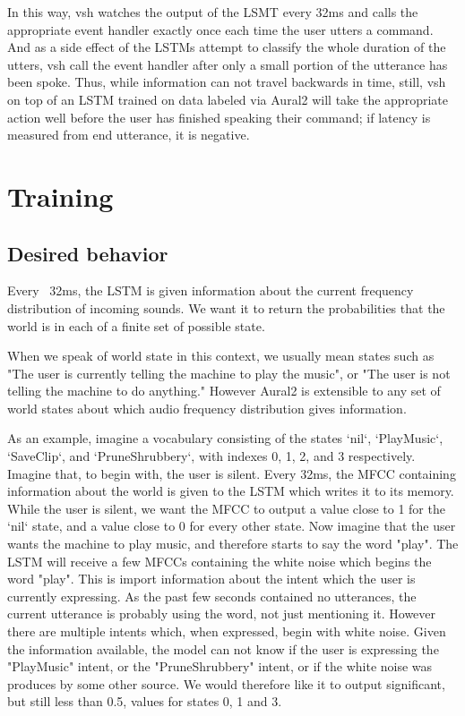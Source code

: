 \documentclass[conference]{IEEEtran}
\begin{document}
In this way, vsh watches the output of the LSMT every 32ms and calls the appropriate event handler exactly once each time the user utters a command.
And as a side effect of the LSTMs attempt to classify the whole duration of the utters, vsh call the event handler after only a small portion of the utterance has been spoke.
Thus, while information can not travel backwards in time, still,
vsh on top of an LSTM trained on data labeled via Aural2 will take the appropriate action well before the user has finished speaking their command;
if latency is measured from end utterance, it is negative.

\section{Training}
\subsection{Desired behavior}
Every ~32ms, the LSTM is given information about the current frequency distribution of incoming sounds.
We want it to return the probabilities that the world is in each of a finite set of possible state.

When we speak of world state in this context, we usually mean states such as "The user is currently telling the machine to play the music", or "The user is not telling the machine to do anything."
However Aural2 is extensible to any set of world states about which audio frequency distribution gives information.

As an example, imagine a vocabulary consisting of the states `nil`, `PlayMusic`, `SaveClip`, and `PruneShrubbery`, with indexes 0, 1, 2, and 3 respectively.
Imagine that, to begin with, the user is silent.
Every 32ms, the MFCC containing information about the world is given to the LSTM which writes it to its memory.
While the user is silent, we want the MFCC to output a value close to 1 for the `nil` state, and a value close to 0 for every other state.
Now imagine that the user wants the machine to play music, and therefore starts to say the word "play".
The LSTM will receive a few MFCCs containing the white noise which begins the word "play".
This is import information about the intent which the user is currently expressing.
As the past few seconds contained no utterances, the current utterance is probably using the word, not just mentioning it.
However there are multiple intents which, when expressed, begin with white noise.
Given the information available, the model can not know if the user is expressing the "PlayMusic" intent, or the "PruneShrubbery" intent, or if the white noise was produces by some other source.
We would therefore like it to output significant, but still less than 0.5, values for states 0, 1 and 3.
\end{document}
